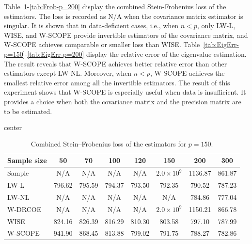 \documentclass[11pt]{article}
\begin{document}
Table~\ref{tab:Frob-p=150}-\ref{tab:Frob-p=200} display the combined Stein-Frobenius loss of the estimators. The loss is recorded as N/A when the covariance matrix estimator is singular.
It is shown that in data-deficient cases, i.e., when $n<p$,  only LW-L, WISE, and W-SCOPE provide invertible estimators of the covariance matrix, and W-SCOPE achieves comparable or smaller loss than WISE. Table~\ref{tab:EigErr-p=150}-\ref{tab:EigErr-p=200} display the relative error of the eigenvalue estimation. The result reveals that W-SCOPE achieves better relative error than other estimators except LW-NL. Moreover, when $n<p$, W-SCOPE achieves the smallest relative error among all the invertible estimators. The result of this experiment shows that W-SCOPE is especially useful when data is insufficient. It provides a choice when both the covariance matrix and the precision matrix are to be estimated.



\begin{table}[H]
\begin{adjustbox}{center}
\begin{tabular}{lccccccc}
\hline
Sample size & 50 & 70 & 100 & 120 & 150 & 200 & 300 \\
\hline
Sample     & N/A & N/A & N/A & N/A & $2.0\times10^{9}$ & 1136.87 & 861.87 \\
LW-L     & 796.62 & 795.59 & 794.37 & 793.50 & 792.35 & 790.52 & 787.23 \\
LW-NL    & N/A & N/A & N/A & N/A & N/A & 784.86 & 777.04 \\
W-DRCOE  & N/A & N/A & N/A & N/A & $2.0\times10^{9}$ & 1150.21 & 866.78 \\
WISE     & 824.16 & 826.39 & 816.29 & 810.30 & 803.58 & 797.10 & 787.99 \\
W-SCOPE     & 941.90 & 868.45 & 813.88 & 799.02 & 791.75 & 788.27 & 782.86 \\
\hline
\end{tabular}
\end{adjustbox}
\caption{Combined Stein–Frobenius loss of the estimators for $p=150$.}
\label{tab:Frob-p=150}
\end{table}
\end{document}
